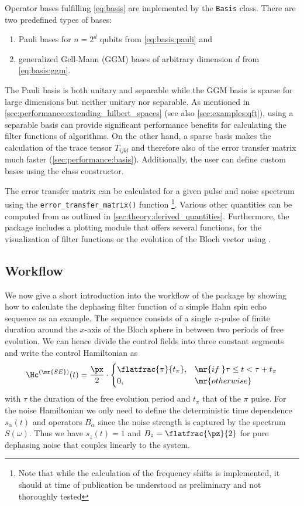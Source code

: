 Operator bases fulfilling \cref{eq:basis} are implemented by the \verb|Basis| class. There are two predefined types of bases:
\begin{enumerate}
    \item Pauli bases for $n = 2^d$ qubits from \cref{eq:basis:pauli} and
    \item generalized Gell-Mann (GGM) bases of arbitrary dimension $d$ from \cref{eq:basis:ggm}.
\end{enumerate}
The Pauli basis is both unitary and separable while the GGM basis is sparse for large dimensions but neither unitary nor separable. As mentioned in \cref{sec:performance:extending_hilbert_spaces} (see also \cref{sec:examples:qft}), using a separable basis can provide significant performance benefits for calculating the filter functions of algorithms. On the other hand, a sparse basis makes the calculation of the trace tensor $T_{ijkl}$ and therefore also of the error transfer matrix \liouvUe much faster (\cf \cref{sec:performance:basis}). Additionally, the user can define custom bases using the class constructor.

The error transfer matrix \liouvUe can be calculated for a given pulse and noise spectrum using the \verb|error_transfer_matrix()| function \footnote{Note that while the calculation of the frequency shifts \freqshifts is implemented, it should at time of publication be understood as preliminary and not thoroughly tested}. Various other quantities can be computed from \liouvUe as outlined in \cref{sec:theory:derived_quantities}. Furthermore, the package includes a plotting module that offers several functions, \eg for the visualization of filter functions or the evolution of the Bloch vector using \qutip.

\subsection{Workflow}\label{sec:software:workflow}
We now give a short introduction into the workflow of the \filterfunctions package by showing how to calculate the dephasing filter function of a simple Hahn spin echo sequence \cite{Hahn1950} as an example. The sequence consists of a single $\pi$-pulse of finite duration around the $x$-axis of the Bloch sphere in between two periods of free evolution. We can hence divide the control fields into three constant segments and write the control Hamiltonian as
\begin{equation}
    \Hc^{(\mr{SE})}(t) = \frac{\px}{2}\cdot\begin{cases}
        \flatfrac{\pi}{t_\pi},  &\mr{if\;} \tau\leq t < \tau + t_\pi \\
        0,                      &\mr{otherwise} \\
    \end{cases}
\end{equation}
with $\tau$ the duration of the free evolution period and $t_\pi$ that of the $\pi$ pulse. For the noise Hamiltonian we only need to define the deterministic time dependence $s_\alpha(t)$ and operators $B_\alpha$ since the noise strength is captured by the spectrum $S(\omega)$. Thus we have $s_z(t) =  1$ and $B_z = \flatfrac{\pz}{2}$ for pure dephasing noise that couples linearly to the system.

